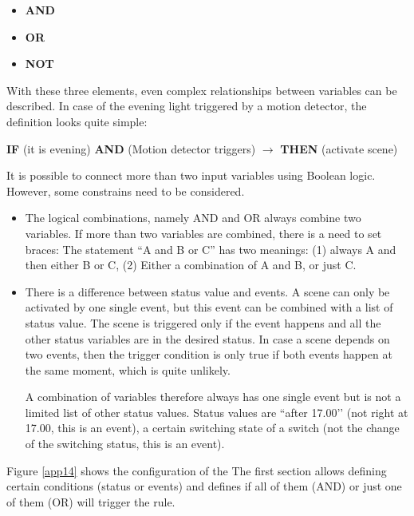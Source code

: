 \begin{itemize}
\item \textbf{AND}
\item \textbf{OR}
\item \textbf{NOT}
\end{itemize}

With these three elements, even complex relationships between variables can be described.
In case of the evening light triggered by a motion detector, the definition looks
quite simple:

\begin{center}
\textbf{IF} (it is evening) \textbf{AND} (Motion detector triggers)
$\rightarrow$
\textbf{THEN} (activate scene)
\end{center}

It is possible to connect more than two input variables using Boolean logic. However, some constrains need to be considered.

\begin{itemize}
\item The logical combinations, namely AND and OR always combine two variables. If more 
than two variables are combined, there is a need to set braces: The statement 
``A and B or C'' has two meanings: (1) always A and then either B or C, (2) Either a 
combination of A and B, or just C.

\item There is a difference between status value and events. A scene can only be 
activated by one single event, but this event can be combined with a list of status 
value. The scene is triggered only if the event happens and all the other status 
variables are in the desired status. In case a scene depends on two events, then 
the trigger condition is only true if both events happen at the same moment, 
which is quite unlikely.

A combination of variables therefore always has one single event but is not a limited 
list of other status values. Status values are ``after 17.00’’ (not right at 17.00, 
this is an event), a certain switching state of a switch (not the change of the 
switching status, this is an event).

\end{itemize}

Figure \ref{app14} shows the configuration of the  The first section 
allows defining certain conditions (status or events) and defines if all of them (AND) 
or just one of them (OR) will trigger the rule.

